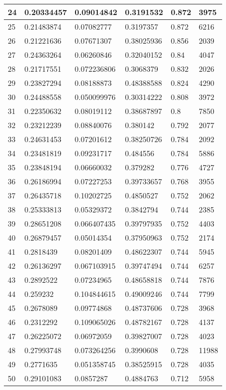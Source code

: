 \begin{longtable}{|l|l|l|l|l|l|}
24 & 0.20334457 & 0.09014842 & 0.3191532 & 0.872 & 3975 \\ \hline 
25 & 0.21483874 & 0.07082777 & 0.3197357 & 0.872 & 6216 \\ \hline 
26 & 0.21221636 & 0.07671307 & 0.38025936 & 0.856 & 2039 \\ \hline 
27 & 0.24363264 & 0.06260846 & 0.32040152 & 0.84 & 4047 \\ \hline 
28 & 0.21717551 & 0.072236806 & 0.3068379 & 0.832 & 2026 \\ \hline 
29 & 0.23827294 & 0.08188873 & 0.48388588 & 0.824 & 4290 \\ \hline 
30 & 0.24488558 & 0.050099976 & 0.30314222 & 0.808 & 3972 \\ \hline 
31 & 0.22350632 & 0.08019112 & 0.38687897 & 0.8 & 7850 \\ \hline 
32 & 0.23212239 & 0.08840076 & 0.380142 & 0.792 & 2077 \\ \hline 
33 & 0.24631453 & 0.07201612 & 0.38250726 & 0.784 & 2092 \\ \hline 
34 & 0.23481819 & 0.09231717 & 0.484556 & 0.784 & 5886 \\ \hline 
35 & 0.23848194 & 0.06660032 & 0.379282 & 0.776 & 4727 \\ \hline 
36 & 0.26186994 & 0.07227253 & 0.39733657 & 0.768 & 3955 \\ \hline 
37 & 0.26435718 & 0.10202725 & 0.4850527 & 0.752 & 2062 \\ \hline 
38 & 0.25333813 & 0.05329372 & 0.3842794 & 0.744 & 2385 \\ \hline 
39 & 0.28651208 & 0.066407435 & 0.39797935 & 0.752 & 4403 \\ \hline 
40 & 0.26879457 & 0.05014354 & 0.37950963 & 0.752 & 2174 \\ \hline 
41 & 0.2818439 & 0.08201409 & 0.48622307 & 0.744 & 5945 \\ \hline 
42 & 0.26136297 & 0.067103915 & 0.39747494 & 0.744 & 6257 \\ \hline 
43 & 0.2892522 & 0.07234965 & 0.48658818 & 0.744 & 7876 \\ \hline 
44 & 0.259232 & 0.104844615 & 0.49009246 & 0.744 & 7799 \\ \hline 
45 & 0.2678089 & 0.09774868 & 0.48737606 & 0.728 & 3968 \\ \hline 
46 & 0.2312292 & 0.109065026 & 0.48782167 & 0.728 & 4137 \\ \hline 
47 & 0.26225072 & 0.06972059 & 0.39827007 & 0.728 & 4023 \\ \hline 
48 & 0.27993748 & 0.073264256 & 0.3990608 & 0.728 & 11988 \\ \hline 
49 & 0.2771635 & 0.051358745 & 0.38525915 & 0.728 & 4035 \\ \hline 
50 & 0.29101083 & 0.0857287 & 0.4884763 & 0.712 & 5958 \\ \hline 
\end{longtable}